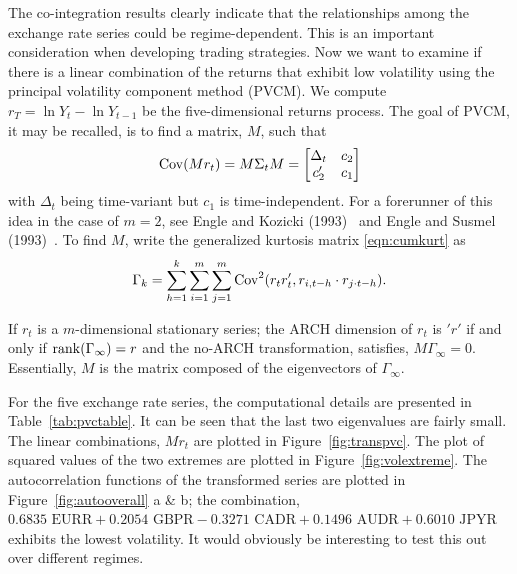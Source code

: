 	
The co-integration results clearly indicate that the relationships among the exchange rate series could be regime-dependent. This is an important consideration when developing trading strategies. Now we want to examine if there is a linear combination of the returns that exhibit low volatility using the principal volatility component method (PVCM). We compute $r_T=\ln Y_t - \ln Y_{t-1}$ be the five-dimensional returns process. The goal of PVCM, it may be recalled, is to find a matrix, $M$, such that
	\begin{equation} \label{eqn:covmatrixM}
	\cov(Mr_t)= M \Sigma_t M= 
	\begin{bmatrix}
	\Delta_t & c_2 \\
	c_2' & c_1
	\end{bmatrix}
	\end{equation}	
with $\Delta_t$ being time-variant but $c_1$ is time-independent. For a forerunner of this idea in the case of $m= 2$, see Engle and Kozicki (1993)~\cite{engle1993testing} and Engle and Susmel (1993)~\cite{engle1993common}. To find $M$, write the generalized kurtosis matrix \eqref{eqn:cumkurt} as
	\begin{equation} \label{eqn:gammakurt}
	\Gamma_k= \sum_{h=1}^k \sum_{i=1}^m \sum_{j=1}^m \cov^2(r_tr_t', r_{i,t-h} \cdot r_{j \cdot t-h}).
	\end{equation}	


\begin{result}
 If $r_t$ is a $m$-dimensional stationary series; the ARCH dimension of $r_t$ is $'r'$ if and only if $\operatorname{rank}(\Gamma_\infty)= r$ and the no-ARCH transformation, satisfies, $M \Gamma_\infty= 0$. Essentially, $M$ is the matrix composed of the eigenvectors of $\Gamma_\infty$.
\end{result}


For the five exchange rate series, the computational details are presented in Table~\ref{tab:pvctable}. It can be seen that the last two eigenvalues are fairly small. The linear combinations, $Mr_t$ are plotted in Figure~\ref{fig:transpvc}. The plot of squared values of the two extremes are plotted in Figure~\ref{fig:volextreme}. The autocorrelation functions of the transformed series are plotted in Figure~\ref{fig:autooverall} a \& b; the combination, $0.6835 \text{ EURR} + 0.2054 \text{ GBPR} - 0.3271 \text{ CADR} + 0.1496 \text{ AUDR} + 0.6010 \text{ JPYR}$ exhibits the lowest volatility. It would obviously be interesting to test this out over different regimes.\label{in:tsm2}

